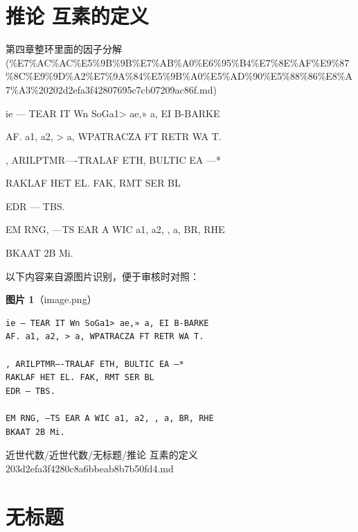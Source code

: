 \section*{推论 互素的定义}

\begin{note}[来源上级主题]

第四章整环里面的因子分解 (\%E7\%AC\%AC\%E5\%9B\%9B\%E7\%AB\%A0\%E6\%95\%B4\%E7\%8E\%AF\%E9\%87\%8C\%E9\%9D\%A2\%E7\%9A\%84\%E5\%9B\%A0\%E5\%AD\%90\%E5\%88\%86\%E8\%A7\%A3\%20202d2efa3f42807695c7cb07209ac86f.md)

\end{note}

\begin{definition}[推论 互素的定义]

ie — TEAR IT Wn SoGa1> ae,» a, EI B-BARKE

AF. a1, a2, > a, WPATRACZA FT RETR WA T.

, ARILPTMR—-TRALAF ETH, BULTIC EA —*

RAKLAF HET EL. FAK, RMT SER BL

EDR — TBS.

EM RNG, —TS EAR A WIC a1, a2, , a, BR, RHE

BKAAT 2B Mi.

\end{definition}

\begin{note}
以下内容来自源图片识别，便于审核时对照：

\textbf{图片 1}（image.png）
\begin{Verbatim}[fontsize=\small]
ie — TEAR IT Wn SoGa1> ae,» a, EI B-BARKE
AF. a1, a2, > a, WPATRACZA FT RETR WA T.

, ARILPTMR—-TRALAF ETH, BULTIC EA —*
RAKLAF HET EL. FAK, RMT SER BL
EDR — TBS.

EM RNG, —TS EAR A WIC a1, a2, , a, BR, RHE
BKAAT 2B Mi.
\end{Verbatim}

\end{note}

\begin{note}[来源路径]

近世代数/近世代数/无标题/推论 互素的定义 203d2efa3f4280c8a6bbeab8b7b50fd4.md

\end{note}

\section*{无标题}

